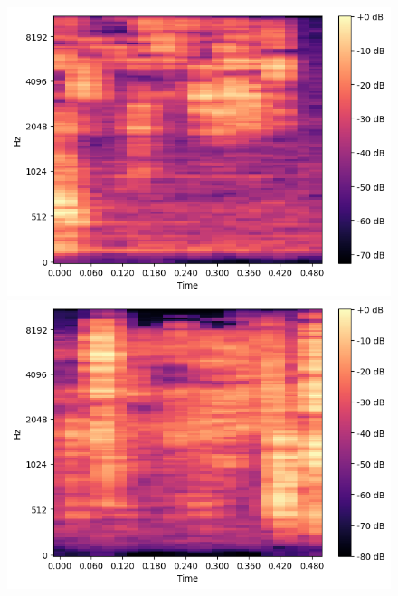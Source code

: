 \begin{figure}[t]
\begin{minipage}[b]{0.16\hsize}
        \includegraphics[width=\hsize]{img/melspec/neapolitan.png}
    \end{minipage}
    \begin{minipage}[b]{0.16\hsize}
        \centering
        \includegraphics[width=\hsize]{img/melspec/yogurt.png}
    \end{minipage}
    \begin{minipage}[b]{0.16\hsize}
        \centering

\end{minipage}
\end{figure}
